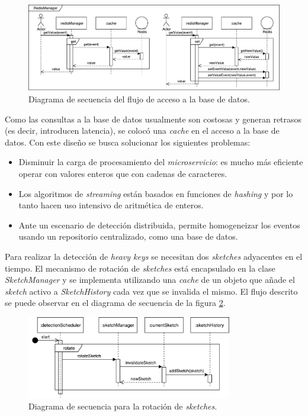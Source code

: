 \documentclass[a4paper,10pt, oneside]{article}
\begin{document}
\begin{figure}[htbp]
	\centering
	\includegraphics[width=1\textwidth]{graph/SecDiag-redisManagerGetValue.pdf}
	\caption{Diagrama de secuencia del flujo de acceso a la base de datos.}
	\label{fig:RedisManagerGetValue}
	
\end{figure}

Como las consultas a la base de datos usualmente son costosas y generan retrasos (es decir, introducen latencia), se colocó una \textit{cache} en el acceso a la base de datos. Con este diseño se busca solucionar los siguientes problemas:
\begin{itemize}
	\item Disminuir la carga de procesamiento del \textit{microservicio}: es mucho más eficiente operar con valores enteros que con cadenas de caracteres.
	\item Los algoritmos de \textit{streaming} están basados en funciones de \textit{hashing} y por lo tanto hacen uso intensivo de aritmética de enteros.
	\item Ante un escenario de detección distribuida, permite homogeneizar los eventos usando un repositorio centralizado, como una base de datos.
\end{itemize}


Para realizar la detección de \textit{heavy keys} se necesitan dos \textit{sketches} adyacentes en el tiempo. El mecanismo de rotación de \textit{sketches} está encapsulado en la clase \textit{SketchManager} y se implementa utilizando una \textit{cache} de un objeto que añade el \textit{sketch} activo a \textit{SketchHistory} cada vez que se invalida el mismo. El flujo descrito se puede observar en el diagrama de secuencia de la figura \ref{fig:SecDiagDetectionSchedulerRotation}.

\begin{figure}[htbp]
	\centering
	\includegraphics[width=0.8\textwidth]{graph/SecDiag-detectionSchedulerRotation.pdf}
	\caption{Diagrama de secuencia para la rotación de \textit{sketches}.}
	\label{fig:SecDiagDetectionSchedulerRotation}
\end{figure}
\end{document}
